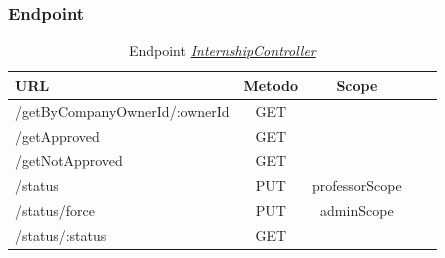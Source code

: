 \subsubsection{Endpoint}
\label{server:internship-controller}
\begin{table}[H]
	\ttfamily
	\caption{Endpoint \hyperref[server:internship-controller]{\textit{InternshipController}}}
	\centering
	\label{table:api:internship-controller}
	\begin{tabular}{l c c c c}    
		URL  & Metodo & Scope \\ 
		\midrule
		/getByCompanyOwnerId/:ownerId & GET    \\
		/getApproved & GET   \\
		/getNotApproved & GET   \\
		/status & PUT & professorScope \\
		/status/force & PUT & adminScope \\
		/status/:status & GET \\
		\bottomrule
	\end{tabular}
\end{table}

